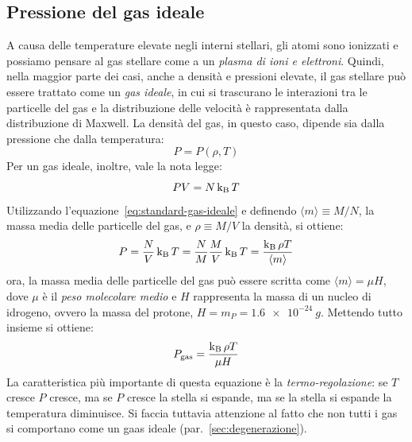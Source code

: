 \subsection{Pressione del gas ideale}\label{sec:gas-perfetto}
A causa delle temperature elevate negli interni stellari, gli atomi sono ionizzati e possiamo pensare al gas stellare come a un \emph{plasma di ioni e elettroni}. Quindi, nella maggior parte dei casi, anche a densità e pressioni elevate, il gas stellare può essere trattato come un \emph{gas ideale}, in cui si trascurano le interazioni tra le particelle del gas e la distribuzione delle velocità è rappresentata dalla distribuzione di Maxwell. La densità del gas, in questo caso, dipende sia dalla pressione che dalla temperatura:
\[
P = P (\rho, T)
\]
Per un gas ideale, inoltre, vale la nota legge:
\begin{equation}\label{eq:standard-gas-ideale}
    PV = N \operatorname{k_B} T
\end{equation}
Utilizzando l'equazione~\eqref{eq:standard-gas-ideale} e definendo $\langle m \rangle \equiv M / N$, la massa media delle particelle del gas, e $\rho \equiv M / V$ la densità, si ottiene:
\[
P = \frac{N}{V} \operatorname{k_B} T = \frac{N}{M} \frac{M}{V} \operatorname{k_B} T = \frac{\operatorname{k_B} \rho T}{\langle m \rangle}
\]
ora, la massa media delle particelle del gas può essere scritta come $\langle m \rangle = \mu H$, dove $\mu$ è il \emph{peso molecolare medio} e $H$ rappresenta la massa di un nucleo di idrogeno, ovvero la massa del protone, $H = m_P = \SI{1.6e-24}{g}$. Mettendo tutto insieme si ottiene:
\begin{equation}\label{eq:gas-ideale}
    P_\textup{gas} = \frac{\operatorname{k_B} \rho T}{\mu H}
\end{equation}
La caratteristica più importante di questa equazione è la \emph{termo-regolazione}: se $T$ cresce $P$ cresce, ma se $P$ cresce la stella si espande, ma se la stella si espande la temperatura diminuisce. Si faccia tuttavia attenzione al fatto che non tutti i gas si comportano come un gaas ideale (par.~\ref{sec:degenerazione}).

